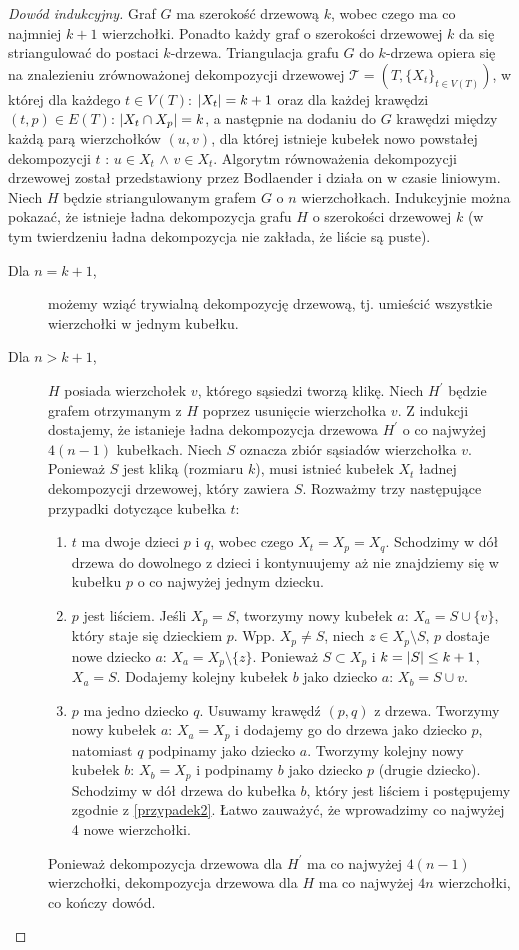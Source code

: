 \documentclass[12pt, oneside]{report}
\begin{document}
\begin{proof}[Dowód indukcyjny]
Graf $G$ ma szerokość drzewową $k$, wobec czego ma co najmniej $k+1$ wierzchołki. Ponadto każdy graf o szerokości drzewowej $k$ da się striangulować do postaci $k$-drzewa. Triangulacja grafu $G$ do $k$-drzewa opiera się na znalezieniu zrównoważonej dekompozycji drzewowej $\mathcal{T} = (T, \{X_t\}_{t \in V(T)})$, w której dla każdego $t \in V(T)$: $\abs{X_t} = k+1$ oraz dla każdej krawędzi $(t, p) \in E(T)$: $\abs{X_t \cap X_p} = k$, a następnie na dodaniu do $G$ krawędzi między każdą parą wierzchołków $(u, v)$, dla której istnieje kubełek nowo powstałej dekompozycji $t$ : $u \in X_t$ $\wedge$ $v \in X_t$. Algorytm równoważenia dekompozycji drzewowej został przedstawiony przez Bodlaender \cite{bodlaender} i działa on w czasie liniowym. Niech $H$ będzie striangulowanym grafem $G$ o $n$ wierzchołkach. Indukcyjnie można pokazać, że istnieje ładna dekompozycja grafu $H$ o szerokości drzewowej $k$ (w tym twierdzeniu ładna dekompozycja nie zakłada, że liście są puste).
\begin{description}
\item[Dla $n=k+1$,]{możemy wziąć trywialną dekompozycję drzewową, tj. umieścić wszystkie wierzchołki w jednym kubełku.}
\item[Dla $n>k+1$,]{$H$ posiada wierzchołek $v$, którego sąsiedzi tworzą klikę. Niech $H^{\prime}$ będzie grafem otrzymanym z $H$ poprzez usunięcie wierzchołka $v$. Z indukcji dostajemy, że istanieje ładna dekompozycja drzewowa $H^{\prime}$ o co najwyżej $4(n-1)$ kubełkach. Niech $S$ oznacza zbiór sąsiadów wierzchołka $v$. Ponieważ $S$ jest kliką (rozmiaru $k$), musi istnieć kubełek $X_t$ ładnej dekompozycji drzewowej, który zawiera $S$. Rozważmy trzy następujące przypadki dotyczące kubełka $t$:
\begin{enumerate}
\item{$t$ ma dwoje dzieci $p$ i $q$, wobec czego $X_t = X_p = X_q$. Schodzimy w dół drzewa do dowolnego z dzieci i kontynuujemy aż nie znajdziemy się w kubełku $p$ o co najwyżej jednym dziecku.}
\item{$p$ jest liściem. Jeśli $X_p = S$, tworzymy nowy kubełek $a$: $X_a = S \cup \{v\}$, który staje się dzieckiem $p$. Wpp. $X_p \neq S$, niech $z \in X_p \setminus{S}$, $p$ dostaje nowe dziecko $a$: $X_a = X_p \setminus \{z\}$. Ponieważ $S \subset X_p$ i $k = \abs{S} \leq k+1$, $X_a = S$. Dodajemy kolejny kubełek $b$ jako dziecko $a$: $X_b = S \cup {v}$.}
\label{przypadek2}
\item{$p$ ma jedno dziecko $q$. Usuwamy krawędź $(p, q)$ z drzewa. Tworzymy nowy kubełek $a$: $X_a = X_p$ i dodajemy go do drzewa jako dziecko $p$, natomiast $q$ podpinamy jako dziecko $a$. Tworzymy kolejny nowy kubełek $b$: $X_b = X_p$ i podpinamy $b$ jako dziecko $p$ (drugie dziecko). Schodzimy w dół drzewa do kubełka $b$, który jest liściem i postępujemy zgodnie z \ref{przypadek2}. Łatwo zauważyć, że wprowadzimy co najwyżej 4 nowe wierzchołki.} 
\end{enumerate}
Ponieważ dekompozycja drzewowa dla $H^{\prime}$ ma co najwyżej $4(n-1)$ wierzchołki, dekompozycja drzewowa dla $H$ ma co najwyżej $4n$ wierzchołki, co kończy dowód.}
\end{description}
\end{proof}
\end{document}

